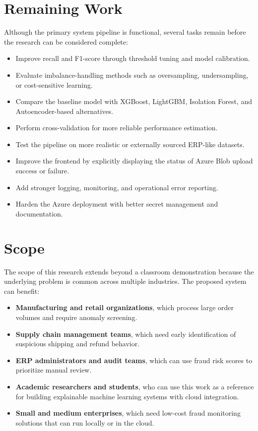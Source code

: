 \documentclass[a4paper,12pt]{article}
\begin{document}
\section{Remaining Work}
Although the primary system pipeline is functional, several tasks remain before the research can be considered complete:
\begin{itemize}[noitemsep]
    \item Improve recall and F1-score through threshold tuning and model calibration.
    \item Evaluate imbalance-handling methods such as oversampling, undersampling, or cost-sensitive learning.
    \item Compare the baseline model with XGBoost, LightGBM, Isolation Forest, and Autoencoder-based alternatives.
    \item Perform cross-validation for more reliable performance estimation.
    \item Test the pipeline on more realistic or externally sourced ERP-like datasets.
    \item Improve the frontend by explicitly displaying the status of Azure Blob upload success or failure.
    \item Add stronger logging, monitoring, and operational error reporting.
    \item Harden the Azure deployment with better secret management and documentation.
\end{itemize}

\section{Scope}
The scope of this research extends beyond a classroom demonstration because the underlying problem is common across multiple industries. The proposed system can benefit:
\begin{itemize}[noitemsep]
    \item \textbf{Manufacturing and retail organizations}, which process large order volumes and require anomaly screening.
    \item \textbf{Supply chain management teams}, which need early identification of suspicious shipping and refund behavior.
    \item \textbf{ERP administrators and audit teams}, which can use fraud risk scores to prioritize manual review.
    \item \textbf{Academic researchers and students}, who can use this work as a reference for building explainable machine learning systems with cloud integration.
    \item \textbf{Small and medium enterprises}, which need low-cost fraud monitoring solutions that can run locally or in the cloud.
\end{itemize}
\end{document}
